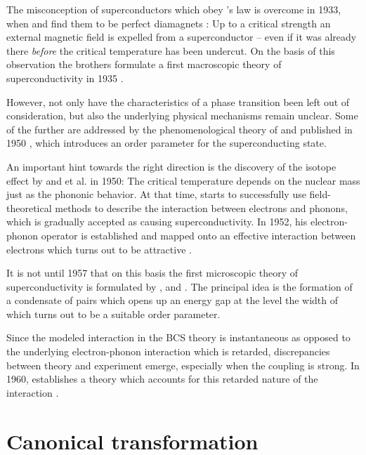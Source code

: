 The misconception of superconductors which obey 's law is overcome in
1933, when  and  find them to be perfect
diamagnets \cite{MeissnerOchsenfeld33}: Up to a critical strength an external
magnetic field is expelled from a superconductor -- even if it was already there
\emph{before} the critical temperature has been undercut. On the basis of this
observation the  brothers formulate a first macroscopic theory of
superconductivity in 1935 \cite{LondonLondon35}.

However, not only have the characteristics of a phase transition been left out
of consideration, but also the underlying physical mechanisms remain unclear.
Some of the further are addressed by the phenomenological theory of
 and  published in 1950 \cite{GinzburgLandau50},
which introduces an order parameter for the superconducting state.

An important hint towards the right direction is the discovery of the isotope
effect by  \cite{Maxwell50} and  et al.
\cite{ReynoldsSerinWrightNesbitt50} in 1950: The critical temperature depends on
the nuclear mass just as the phononic behavior. At that time, 
starts to successfully use field-theoretical methods to describe the interaction
between electrons and phonons, which is gradually accepted as causing
superconductivity. In 1952, his electron-phonon  operator is
established and mapped onto an effective interaction between electrons which
turns out to be attractive \cite{Froehlich52}.

It is not until 1957 that on this basis the first microscopic theory of
superconductivity is formulated by ,  and
 \cites {BardeenCooperSchrieffer57a}
{BardeenCooperSchrieffer57b}. The principal idea is the formation of a
condensate of  pairs which opens up an energy gap at the
 level the width of which turns out to be a suitable order
parameter.

Since the modeled interaction in the BCS theory is instantaneous as opposed to
the underlying electron-phonon interaction which is retarded, discrepancies
between theory and experiment emerge, especially when the coupling is strong. In
1960,  establishes a theory which accounts for this retarded
nature of the interaction \cite{Eliashberg60}.

\section{Canonical transformation}

